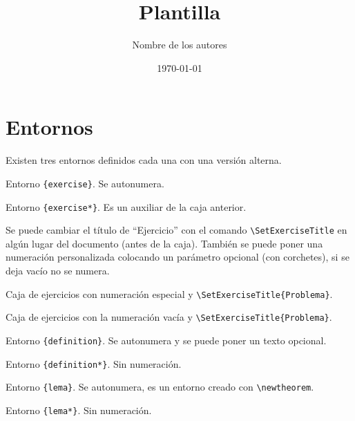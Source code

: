 \documentclass[11pt]{article}
\title{Plantilla}
\author{Nombre de los autores}
\date{\today}
\begin{document}
\maketitle


\section{Entornos}

Existen tres entornos definidos cada una con una versión alterna.

\begin{exercise}
  Entorno \verb|{exercise}|. Se autonumera.
\end{exercise}

\begin{exercise*}
  Entorno \verb|{exercise*}|. Es un auxiliar de la caja anterior.
\end{exercise*}

Se puede cambiar el título de ``Ejercicio'' con el comando \verb|\SetExerciseTitle| en algún lugar del documento (antes de la caja). También se puede poner una numeración personalizada colocando un parámetro opcional (con corchetes), si se deja vacío no se numera. 



\begin{exercise}
  Caja de ejercicios con numeración especial y \verb|\SetExerciseTitle{Problema}|.
\end{exercise}

\begin{exercise}[]
  Caja de ejercicios con la numeración vacía y \verb|\SetExerciseTitle{Problema}|.
\end{exercise}



\begin{definition}
  Entorno \verb|{definition}|. Se autonumera y se puede poner un texto opcional.
\end{definition}

\begin{definition*}
  Entorno \verb|{definition*}|. Sin numeración.
\end{definition*}

\begin{lemma}
  Entorno \verb|{lema}|. Se autonumera, es un entorno creado con \verb|\newtheorem|.
\end{lemma}

\begin{lemma*}
  Entorno \verb|{lema*}|. Sin numeración.
\end{lemma*}
\end{document}
